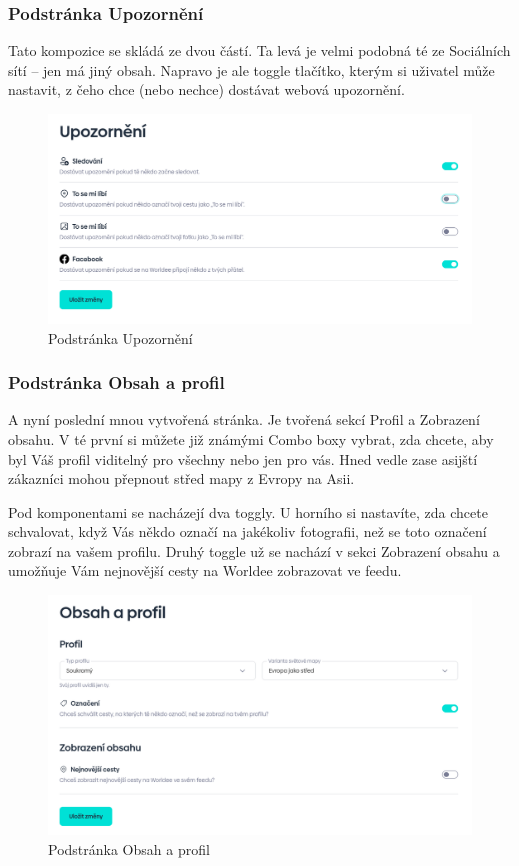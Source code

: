 \newpage
\subsubsection{Podstránka Upozornění}
Tato kompozice se skládá ze dvou částí. Ta levá je velmi podobná té ze Sociálních sítí – jen má jiný obsah. Napravo je ale toggle tlačítko, kterým si uživatel může nastavit, z čeho chce (nebo nechce) dostávat webová upozornění.

\begin{figure}[!h]
    \centering
    \includegraphics[width=1\linewidth]{obrazky/notify_settings.png}
    \caption{Podstránka Upozornění}
\end{figure}


\newpage
\subsubsection{Podstránka Obsah a profil}
A nyní poslední mnou vytvořená stránka. Je tvořená sekcí Profil a Zobrazení obsahu. V té první si můžete již známými Combo boxy vybrat, zda chcete, aby byl Váš profil viditelný pro všechny nebo jen pro vás. Hned vedle zase asijští zákazníci mohou přepnout střed mapy z Evropy na Asii.

Pod komponentami se nacházejí dva toggly. U horního si nastavíte, zda chcete schvalovat, když Vás někdo označí na jakékoliv fotografii, než se toto označení zobrazí na vašem profilu. Druhý toggle už se nachází v sekci Zobrazení obsahu a umožňuje Vám nejnovější cesty na Worldee zobrazovat ve feedu.

\begin{figure}[!h]
    \centering
    \includegraphics[width=1\linewidth]{obrazky/content_and_profile.png}
    \caption{Podstránka Obsah a profil}
\end{figure}


